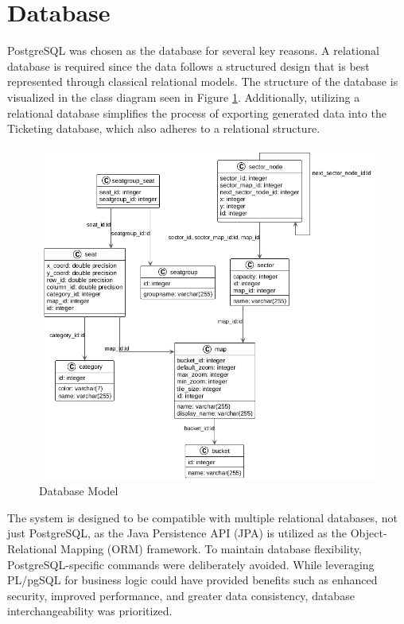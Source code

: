 \section{Database}
PostgreSQL was chosen as the database for several key reasons. A relational database is required since the data follows a structured design that is best represented through classical relational models. The structure of the database is visualized in the class diagram seen in Figure \ref{fig:db_model}. Additionally, utilizing a relational database simplifies the process of exporting generated data into the Ticketing database, which also adheres to a relational structure.

\begin{figure}
    \centering
    \includegraphics[scale=0.5]{pics/db_model.png}
    \caption{Database Model}
    \label{fig:db_model}
\end{figure}

The system is designed to be compatible with multiple relational databases, not just PostgreSQL, as the Java Persistence API (JPA) is utilized as the Object-Relational Mapping (ORM) framework. To maintain database flexibility, PostgreSQL-specific commands were deliberately avoided. While leveraging PL/pgSQL for business logic could have provided benefits such as enhanced security, improved performance, and greater data consistency, database interchangeability was prioritized.

